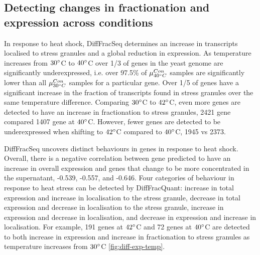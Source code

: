 \documentclass[../main.tex]{subfiles}
\begin{document}
\subsection{Detecting changes in fractionation and expression across conditions}

In response to heat shock, DiffFracSeq determines an increase in transcripts localised to stress granules and a global reduction in expression.
As temperature increases from $30\degree$C to $40\degree$C over 1/3 of genes in the yeast genome are significantly underexpressed, i.e. over 97.5\% of $\mu^{Con}_{40\degree C}$ samples are significantly lower than all $\mu^{Con}_{30\degree C}$ samples for a particular gene.  
Over 1/5 of genes have a significant increase in the fraction of transcripts found in stress granules over the same temperature difference.
Comparing $30\degree$C to $42\degree$C, even more genes are detected to have an increase in fractionation to stress granules, 2421 gene compared 1407 gene at $40\degree$C.
However, fewer genes are detected to be underexpressed when shifting to $42\degree$C compared to $40\degree$C, 1945 vs 2373.

DiffFracSeq uncovers distinct behaviours in genes in response to heat shock.
Overall, there is a negative correlation between gene predicted to have an increase in overall expression and genes that change to be more concentrated in the supernatant, {-0.539}, -0.557, and -0.646.
Four categories of behaviour in response to heat stress can be detected by DiffFracQuant: increase in total expression and increase in localisation to the stress granule, decrease in total expression and decrease in localisation to the stress granule, increase in expression and decrease in localisation, and decrease in expression and increase in localisation.
For example, 191 genes at $42\degree$C  and 72 genes at $40\degree$C  are detected to both increase in expression and increase in fractionation to stress granules as temperature increases from $30\degree$C \ref{fig:diff-exp-temp}.
\end{document}
